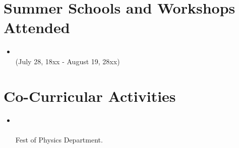 \documentclass{My_CV}
\begin{document}
\begin{paracol}{2}
\begin{rightcolumn}
\begin{itemize}
\end{itemize}



\section{{\faHourglass[2]} Summer Schools and Workshops Attended}

\begin{itemize}

    \item {} \\
     \hfill{(July 28, 18xx - August 19, 28xx)} \\
    
\end{itemize}



\section{{\faInstitution} Co-Curricular Activities}

\begin{itemize}

    \item {} \\
     \\
    Fest of Physics Department. \\

\end{itemize}



\end{rightcolumn}



\end{paracol}



\end{document}
